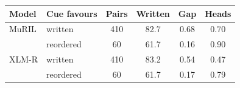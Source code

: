 \begin{tabular}{@{}llcccc@{}}
\toprule
Model & Cue favours & Pairs & Written & Gap & Heads \\
\midrule
MuRIL & written & 410 & 82.7 & 0.68 & 0.70 \\
 & reordered & 60 & 61.7 & 0.16 & 0.90 \\
XLM-R & written & 410 & 83.2 & 0.54 & 0.47 \\
 & reordered & 60 & 61.7 & 0.17 & 0.79 \\
\bottomrule
\end{tabular}
